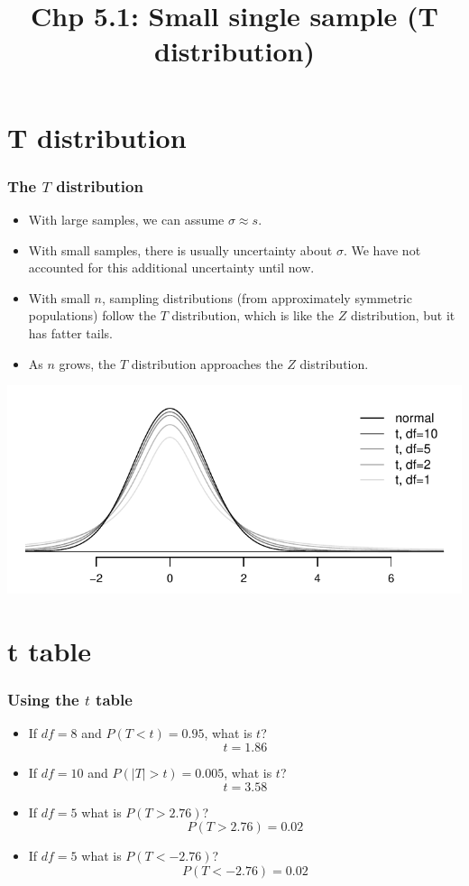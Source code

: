 \documentclass[slidestop,compress,mathserif]{beamer}
\title[Chp 5.1: Small single sample (T distribution)]{Chp 5.1: Small single sample (T distribution)}
\newcommand{\soln}[1]{\textit{#1}}
\begin{document}
\section{T distribution}

\begin{frame}
\frametitle{The $T$ distribution}
\begin{itemize}
\item With large samples, we can assume $\sigma \approx s$.
\pause
\item With small samples, there is usually uncertainty about $\sigma$. We have not accounted for this additional uncertainty until now.
\pause
\item With small $n$, sampling distributions (from approximately symmetric populations) follow the $T$ distribution, which is like the $Z$ distribution, but it has fatter tails.
\pause
\item As $n$ grows, the $T$ distribution approaches the $Z$ distribution.
\pause
\end{itemize}
\begin{center}
\includegraphics[scale=0.8]{figures/tDistConvergeToNormalDist/tDistConvergeToNormalDist.pdf}
\end{center}
\end{frame}


\section{t table}

\begin{frame}
\frametitle{Using the $t$ table}
\begin{itemize}
\item If $df=8$ and $P(T<t)=0.95$, what is $t$?\pause
\soln{$$t=1.86$$}\pause
\vfill
\item If $df=10$ and $P(|T|>t)=0.005$, what is $t$?\pause
\soln{$$t=3.58$$}\pause
\vfill
\item If $df=5$ what is $P(T>2.76)$?\pause
\soln{$$P(T>2.76) = 0.02$$}\pause
\vfill
\item If $df=5$ what is $P(T<-2.76)$?\pause
\soln{$$P(T<-2.76) = 0.02$$}\pause
\vfill
\end{itemize}
\end{frame}
\end{document}
